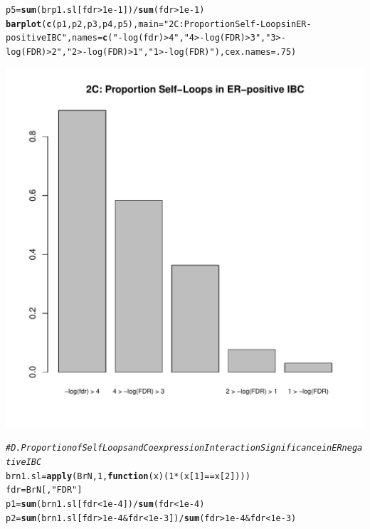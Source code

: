 \documentclass{article}\usepackage[]{graphicx}\usepackage[]{color}
\makeatletter
\def\maxwidth{ %
  \ifdim\Gin@nat@width>\linewidth
    \linewidth
  \else
    \Gin@nat@width
  \fi
}
\newcommand{\hlnum}[1]{\textcolor[rgb]{0.686,0.059,0.569}{#1}}%
\newcommand{\hlstr}[1]{\textcolor[rgb]{0.192,0.494,0.8}{#1}}%
\newcommand{\hlcom}[1]{\textcolor[rgb]{0.678,0.584,0.686}{\textit{#1}}}%
\newcommand{\hlopt}[1]{\textcolor[rgb]{0,0,0}{#1}}%
\newcommand{\hlstd}[1]{\textcolor[rgb]{0.345,0.345,0.345}{#1}}%
\newcommand{\hlkwa}[1]{\textcolor[rgb]{0.161,0.373,0.58}{\textbf{#1}}}%
\newcommand{\hlkwb}[1]{\textcolor[rgb]{0.69,0.353,0.396}{#1}}%
\newcommand{\hlkwc}[1]{\textcolor[rgb]{0.333,0.667,0.333}{#1}}%
\newcommand{\hlkwd}[1]{\textcolor[rgb]{0.737,0.353,0.396}{\textbf{#1}}}%
\newenvironment{kframe}{%
 \def\at@end@of@kframe{}%
 \ifinner\ifhmode%
  \def\at@end@of@kframe{\end{minipage}}%
  \begin{minipage}{\columnwidth}%
 \fi\fi%
 \def\FrameCommand##1{\hskip\@totalleftmargin \hskip-\fboxsep
 \colorbox{shadecolor}{##1}\hskip-\fboxsep
     \hskip-\linewidth \hskip-\@totalleftmargin \hskip\columnwidth}%
 \MakeFramed {\advance\hsize-\width
   \@totalleftmargin\z@ \linewidth\hsize
   \@setminipage}}%
 {\par\unskip\endMakeFramed%
 \at@end@of@kframe}
\newenvironment{knitrout}{}{} %
\makeatother
\begin{document}
\begin{knitrout}
\begin{kframe}
\begin{alltt}
\hlstd{p5}\hlkwb{=}\hlkwd{sum}\hlstd{(brp1.sl[fdr}\hlopt{>}\hlnum{1e-1}\hlstd{])}\hlopt{/}\hlkwd{sum}\hlstd{(fdr}\hlopt{>}\hlnum{1e-1}\hlstd{)}
\hlkwd{barplot}\hlstd{(}\hlkwd{c}\hlstd{(p1,p2,p3,p4,p5),}\hlkwc{main}\hlstd{=}\hlstr{"2C: Proportion Self-Loops in ER-positive IBC"}\hlstd{,}\hlkwc{names}\hlstd{=}\hlkwd{c}\hlstd{(}\hlstr{"-log(fdr) > 4"}\hlstd{,} \hlstr{"4 > -log(FDR) > 3"}\hlstd{,}\hlstr{"3 > -log(FDR) > 2"}\hlstd{,}\hlstr{"2 > -log(FDR) > 1"}\hlstd{,}\hlstr{"1 > -log(FDR)"}\hlstd{),}\hlkwc{cex.names}\hlstd{=}\hlnum{.75}\hlstd{)}
\end{alltt}
\end{kframe}
\includegraphics[width=\maxwidth]{figure/Figure_2-3} 
\begin{kframe}\begin{alltt}
\hlcom{# D. Proportion of Self Loops and Coexpression Interaction Significance in ER negative IBC}
\hlstd{brn1.sl}\hlkwb{=}\hlkwd{apply}\hlstd{(BrN,}\hlnum{1}\hlstd{,}\hlkwa{function}\hlstd{(}\hlkwc{x}\hlstd{)(}\hlnum{1}\hlopt{*}\hlstd{(x[}\hlnum{1}\hlstd{]}\hlopt{==}\hlstd{x[}\hlnum{2}\hlstd{])))}
\hlstd{fdr}\hlkwb{=}\hlstd{BrN[,}\hlstr{"FDR"}\hlstd{]}
\hlstd{p1}\hlkwb{=}\hlkwd{sum}\hlstd{(brn1.sl[fdr}\hlopt{<}\hlnum{1e-4}\hlstd{])}\hlopt{/}\hlkwd{sum}\hlstd{(fdr}\hlopt{<}\hlnum{1e-4}\hlstd{)}
\hlstd{p2}\hlkwb{=}\hlkwd{sum}\hlstd{(brn1.sl[fdr}\hlopt{>}\hlnum{1e-4} \hlopt{&} \hlstd{fdr}\hlopt{<}\hlnum{1e-3}\hlstd{])}\hlopt{/}\hlkwd{sum}\hlstd{(fdr}\hlopt{>}\hlnum{1e-4} \hlopt{&} \hlstd{fdr}\hlopt{<}\hlnum{1e-3}\hlstd{)}

\end{alltt}
\end{kframe}
\end{knitrout}
\end{document}

